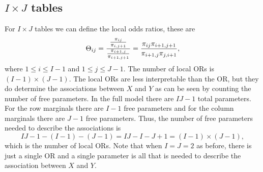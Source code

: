 \subsection{$I \times J$ tables}
For $I \times J$ tables we can define the local odds ratios, these are 
\[{\Theta}_{ij} = \frac{\frac{\pi_{ij}}{\pi_{i,j+1}}}{\frac{\pi_{i+1,j}}{\pi_{i+1,j+1}}} = \frac{\pi_{ij}\pi_{i+1,j+1}}{\pi_{i+1,j}\pi_{j,i+1}}, \]
where $1 \le i \le I-1$ and $1 \le j \le J-1$. The number of local ORs is $(I-1)\times (J-1)$. The local ORs are less interpretable than the OR, but they do determine the associations between $X$ and $Y$ as can be seen by counting the number of free parameters. In the full model there are $IJ-1$ total parameters. For the row marginals there are $I-1$ free parameters and for the column marginals there are $J-1$ free parameters. Thus, the number of free parameters needed to describe the associations is
\[IJ-1 - (I-1)-(J-1) = IJ-I-J+1=(I-1)\times(J-1), \]
which is the number of local ORs. Note that when $I=J=2$ as before, there is just a single OR and a single parameter is all that is needed to describe the association between $X$ and $Y$.
